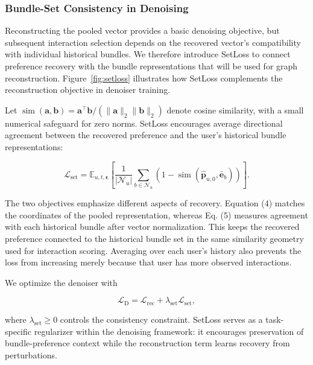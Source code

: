 \documentclass[letterpaper]{article}
\begin{document}
\subsubsection{Bundle-Set Consistency in Denoising}

Reconstructing the pooled vector provides a basic denoising objective, but subsequent interaction selection depends on the recovered vector's compatibility with individual historical bundles. We therefore introduce SetLoss to connect preference recovery with the bundle representations that will be used for graph reconstruction. Figure~\ref{fig:setloss} illustrates how SetLoss complements the reconstruction objective in denoiser training.

Let $\operatorname{sim}(\mathbf a,\mathbf b)=\mathbf a^\top\mathbf b/(\|\mathbf a\|_2\|\mathbf b\|_2)$ denote cosine similarity, with a small numerical safeguard for zero norms. SetLoss encourages average directional agreement between the recovered preference and the user's historical bundle representations:

\begin{equation}
\mathcal L_{\mathrm{set}}
=\mathbb E_{u,t,\boldsymbol\epsilon}
\left[
\frac{1}{|\mathcal N_u|}
\sum_{b\in\mathcal N_u}
\left(1-\operatorname{sim}
\left(\widehat{\mathbf p}_{u,0},\bar{\mathbf e}_b\right)\right)
\right].
\tag{5}
\end{equation}

The two objectives emphasize different aspects of recovery. Equation (4) matches the coordinates of the pooled representation, whereas Eq. (5) measures agreement with each historical bundle after vector normalization. This keeps the recovered preference connected to the historical bundle set in the same similarity geometry used for interaction scoring. Averaging over each user's history also prevents the loss from increasing merely because that user has more observed interactions.

We optimize the denoiser with

\begin{equation}
\mathcal L_{\mathrm D}
=\mathcal L_{\mathrm{rec}}
+\lambda_{\mathrm{set}}\mathcal L_{\mathrm{set}},
\tag{6}
\end{equation}

where $\lambda_{\mathrm{set}}\geq 0$ controls the consistency constraint. SetLoss serves as a task-specific regularizer within the denoising framework: it encourages preservation of bundle-preference context while the reconstruction term learns recovery from perturbations.
\end{document}
